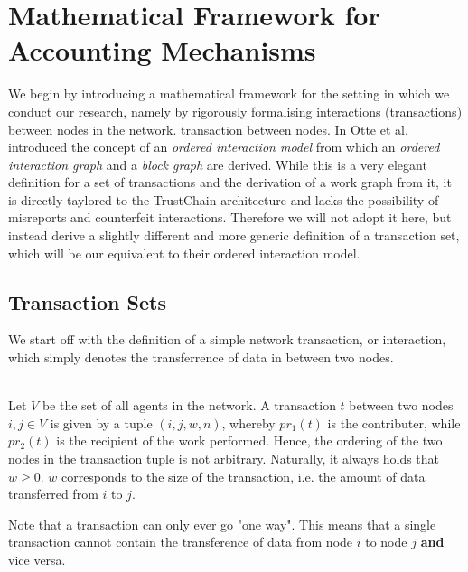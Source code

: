 \chapter{Mathematical Framework for Accounting Mechanisms}
\label{chap:Mathematical Framework for Accounting Mechanisms}
\noindent{}We begin by introducing a mathematical framework for the setting in which we conduct our research, namely by rigorously formalising interactions (transactions) between nodes in the network. transaction between nodes. In \cite{Sybil-resistant Trust Mechanisms in Distributed Systems} Otte et al. introduced the concept of an {\it ordered interaction model} from which an {\it ordered interaction graph} and a {\it block graph} are derived. While this is a very elegant definition for a set of transactions and the derivation of a work graph from it, it is directly taylored to the TrustChain architecture and lacks the possibility of misreports and counterfeit interactions. Therefore we will not adopt it here, but instead derive a slightly different and more generic definition of a transaction set, which will be our equivalent to their ordered interaction model.\vspace{1em}\\


\section{Transaction Sets}
\label{sec:Transaction Sets}
\noindent{}We start off with the definition of a simple network transaction, or interaction, which simply denotes the transferrence of data in between two nodes.\vspace{1em}\\

\begin{definition}\ \\
Let $V$ be the set of all agents in the network. A transaction $t$ between two nodes $i,j\in{}V$ is given by a tuple $(i,j,w,n)$, whereby $pr_1(t)$ is the contributer, while $pr_2(t)$ is the recipient of the work performed. Hence, the ordering of the two nodes in the transaction tuple is not arbitrary. Naturally, it always holds that $w\geq{}0$. $w$ corresponds to the size of the transaction, i.e. the amount of data transferred from $i$ to $j$. \vspace{1em}\\
\end{definition}

\noindent{}Note that a transaction can only ever go "one way". This means that a single transaction cannot contain the transference of data from node $i$ to node $j$ {\bf and} vice versa. \\

